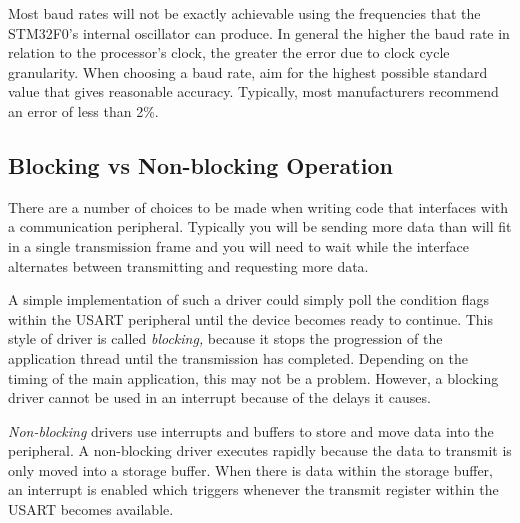 \documentclass[openany,11pt,fleqn]{book} %
\begin{document}
Most baud rates will not be exactly achievable using the frequencies that the STM32F0's internal oscillator can produce. In general the higher the baud rate in relation to the processor's clock, the greater the error due to clock cycle granularity. When choosing a baud rate, aim for the highest possible standard value that gives reasonable accuracy. Typically, most manufacturers recommend an error of less than 2\%. 


\subsection{Blocking vs Non-blocking Operation}
There are a number of choices to be made when writing code that interfaces with a communication peripheral. Typically you will be sending more data than will fit in a single transmission frame and you will need to wait while the interface alternates between transmitting and requesting more data.

A simple implementation of such a driver could simply poll the condition flags within the USART peripheral until the device becomes ready to continue. This style of driver is called \textit{blocking,} because it stops the progression of the application thread until the transmission has completed. Depending on the timing of the main application, this may not be a problem. However, a blocking driver cannot be used in an interrupt because of the delays it causes. 

\textit{Non-blocking} drivers use interrupts and buffers to store and move data into the peripheral. A non-blocking driver executes rapidly because the data to transmit is only moved into a storage buffer. When there is data within the storage buffer, an interrupt is enabled which triggers whenever the transmit register within the USART becomes available. 
\end{document}
